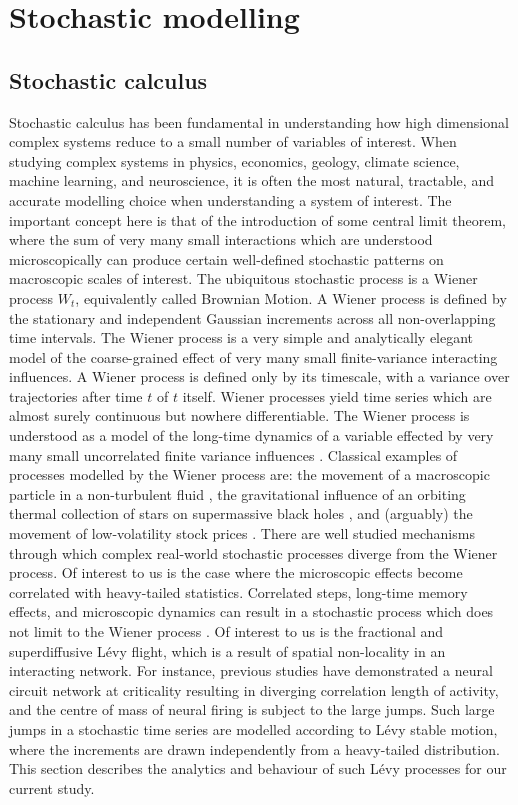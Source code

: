 \section{Stochastic modelling}\label{sec:stoch_modelling}
\subsection{Stochastic calculus}
Stochastic calculus has been fundamental in understanding how high dimensional complex systems reduce to a small number of variables of interest. When studying complex systems in physics, economics, geology, climate science, machine learning, and neuroscience, it is often the most natural, tractable, and accurate modelling choice when understanding a system of interest. The important concept here is that of the introduction of some central limit theorem, where the sum of very many small interactions which are understood microscopically can produce certain well-defined stochastic patterns on macroscopic scales of interest. The ubiquitous stochastic process is a Wiener process $W_t$, equivalently called Brownian Motion. A Wiener process is defined by the stationary and independent Gaussian increments across all non-overlapping time intervals. The Wiener process is a very simple and analytically elegant model of the coarse-grained effect of very many small finite-variance interacting influences. A Wiener process is defined only by its timescale, with a variance over trajectories after time $t$ of $t$ itself. Wiener processes yield time series which are almost surely continuous but nowhere differentiable. The Wiener process is understood as a model of the long-time dynamics of a variable effected by very many small uncorrelated finite variance influences \cite{hassler_stochastic_2016}. Classical examples of processes modelled by the Wiener process are: the movement of a macroscopic particle in a non-turbulent fluid \cite{hassler_stochastic_2016}, the gravitational influence of an orbiting thermal collection of stars on supermassive black holes \cite{Chandrasekhar1943, Merritt2007a}, and (arguably) the movement of low-volatility stock prices \cite{cunchala2024basicoverviewvariousstochastic}. There are well studied mechanisms through which complex real-world stochastic processes diverge from the Wiener process. Of interest to us is the case where the microscopic effects become correlated with heavy-tailed statistics. Correlated steps, long-time memory effects, and microscopic dynamics can result in a stochastic process which does not limit to the Wiener process \cite{Brevitt2025, Klages2013}. Of interest to us is the fractional and superdiffusive Lévy flight, which is a result of spatial non-locality in an interacting network. For instance, previous studies have demonstrated a neural circuit network at criticality resulting in diverging correlation length of activity, and the centre of mass of neural firing is subject to the large jumps. Such large jumps in a stochastic time series are modelled according to Lévy stable motion, where the increments are drawn independently from a heavy-tailed distribution. This section describes the analytics and behaviour of such Lévy processes for our current study.


